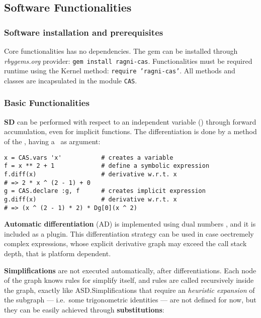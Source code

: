 \subsection{Software Functionalities}
\label{sec:functionalities}

\subsubsection{Software installation and prerequisites}

Core functionalities has no dependencies. The gem can be installed through \emph{rbygems.org} provider: \texttt{gem install ragni-cas}. Functionalities must be required runtime using the Kernel method: \texttt{require 'ragni-cas'}. All methods and classes are incapsulated in the module \texttt{CAS}.

\subsubsection{Basic Functionalities}
\textbf{SD} can be performed with respect to an independent variable (\CASVariable) through forward accumulation, even for implicit functions. The differentiation is done by a method of the \CASOp, having a \CASVariable~as argument:

\begin{lstlisting}[caption={Differentiation example},label={code:example-diff}]
x = CAS.vars 'x'           # creates a variable
f = x ** 2 + 1             # define a symbolic expression
f.diff(x)                  # derivative w.r.t. x
# => 2 * x ^ (2 - 1) + 0
g = CAS.declare :g, f      # creates implicit expression
g.diff(x)                  # derivative w.r.t. x
# => (x ^ (2 - 1) * 2) * Dg[0](x ^ 2)
\end{lstlisting}

\textbf{Automatic differentiation} (AD) is implemented using dual numbers \cite{bartholomew2000automatic}, and it is included as a plugin. This differentiation strategy can be used in case oectremely complex expressions, whose explicit derivative graph may exceed the call stack depth, that is platform dependent.  

\textbf{Simplifications} are not executed automatically, after differentiations. Each node of the graph knows rules for simplify itself, and rules are called recursively inside the graph, exactly like ASD.\@ Simplifications that require an \emph{heuristic expansion} of the subgraph --- i.e.\ some trigonometric identities --- are not defined for now, but they can be easily achieved through \textbf{substitutions}:

